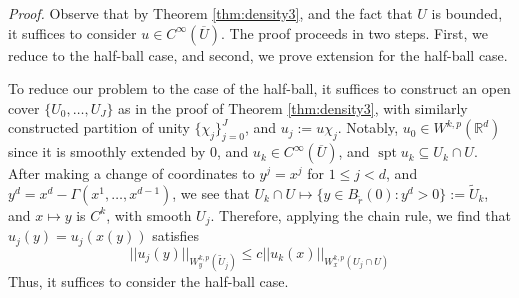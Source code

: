 \documentclass[letterpaper,10pt]{article}
\newcommand{\wkp}{W^{k,p}}
\DeclareMathOperator{\spt}{spt}
\theoremstyle{definition}
\theoremstyle{remark}
\theoremstyle{plain}
\renewenvironment{proof}{
    \vspace{5pt}
    \begin{mdframed}[bottomline=false,topline=false,rightline=false, skipabove=0]
    \noindent\textit{Proof.}}
{
    \hspace{\fill}\qedsymbol
    \end{mdframed}
}
\begin{document}
\begin{proof}
    Observe that by Theorem \ref{thm:density3}, and the fact that $U$ is bounded,
    it suffices to consider $u\in C^\infty(\overline U)$.
    The proof proceeds in two steps. First, we reduce to the half-ball case, and
    second, we prove extension for the half-ball case.

    To reduce our problem to the case of the half-ball, it suffices to 
    construct an open cover $\{U_0,\ldots, U_J\}$ as in the proof of Theorem
    \ref{thm:density3}, with similarly constructed partition of unity 
    $\{\chi_j\}_{j=0}^J$, and $u_j:=u\chi_j$.
    Notably, $u_0\in\wkp(\mathbb R^d)$ since it is smoothly extended by $0$,
    and $u_k\in C^\infty(\overline U)$, and $\spt u_k\subseteq U_k\cap U$.
    After making a change of coordinates to $y^j=x^j$ for $1\leq j<d$, and 
    $y^d=x^d-\Gamma(x^1,\ldots, x^{d-1})$, we see that 
    $U_k\cap U\mapsto\{y\in B_{\tilde r}(0):y^d>0\}:=\tilde U_k$,
    and $x\mapsto y$ is $C^k$, with smooth $U_j$.
    Therefore, applying the chain rule, we find that $u_j(y)=u_j(x(y))$
    satisfies
    $$
    ||u_j(y)||_{\wkp_y(\tilde U_j)}\leq c||u_k(x)||_{\wkp_x(U_j\cap U)}
    $$
    Thus, it suffices to consider the half-ball case.
    

\end{proof}
\end{document}
